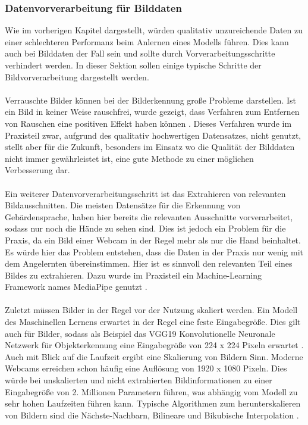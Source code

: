 \documentclass[11pt,bibliography=totocnumbered]{scrartcl}
\begin{document}
\subsubsection{Datenvorverarbeitung für Bilddaten}
Wie im vorherigen Kapitel dargestellt, würden qualitativ unzureichende Daten zu einer schlechteren Performanz beim Anlernen eines Modells führen. Dies kann auch bei Bilddaten der Fall sein und sollte durch Vorverarbeitungsschritte verhindert werden. In dieser Sektion sollen einige typische Schritte der Bildvorverarbeitung dargestellt werden.
\\\\
Verrauschte Bilder können bei der Bilderkennung große Probleme darstellen. Ist ein Bild in keiner Weise rauschfrei, wurde gezeigt, dass Verfahren zum Entfernen von Rauschen eine positiven Effekt haben können \cite{RAUSCH}. Dieses Verfahren wurde im Praxisteil zwar, aufgrund des qualitativ hochwertigen Datensatzes, nicht genutzt, stellt aber für die Zukunft, besonders im Einsatz wo die Qualität der Bilddaten nicht immer gewährleistet ist, eine gute Methode zu einer möglichen Verbesserung dar.
\\\\
Ein weiterer Datenvorverarbeitungsschritt ist das Extrahieren von relevanten Bildausschnitten. Die meisten Datensätze für die Erkennung von Gebärdensprache, haben hier bereits die relevanten Ausschnitte vorverarbeitet, sodass nur noch die Hände zu sehen sind. Dies ist jedoch ein Problem für die Praxis, da ein Bild einer Webcam in der Regel mehr als nur die Hand beinhaltet. Es würde hier das Problem entstehen, dass die Daten in der Praxis nur wenig mit dem Angelernten übereinstimmen. Hier ist es sinnvoll den relevanten Teil eines Bildes zu extrahieren. Dazu wurde im Praxisteil ein Machine-Learning Framework names MediaPipe genutzt \cite{MEDIAPIPE}.
\\\\
Zuletzt müssen Bilder in der Regel vor der Nutzung skaliert werden. Ein Modell des Maschinellen Lernens erwartet in der Regel eine feste Eingabegröße. Dies gilt auch für Bilder, sodass als Beispiel das VGG19 Konvolutionelle Neuronale Netzwerk für Objekterkennung eine Eingabegröße von 224 x 224 Pixeln erwartet \cite[S.2]{SCALE}. Auch mit Blick auf die Laufzeit ergibt eine Skalierung von Bildern Sinn. Moderne Webcams erreichen schon häufig eine Auflösung von 1920 x 1080 Pixeln. Dies würde bei unskalierten und nicht extrahierten Bildinformationen zu einer Eingabegröße von 2. Millionen Parametern führen, was abhängig vom Modell zu sehr hohen Laufzeiten führen kann. Typische Algorithmen zum herunterskalieren von Bildern sind die Nächste-Nachbarn, Bilineare und Bikubische Interpolation \cite[S.2]{SCALE}.
\end{document}
